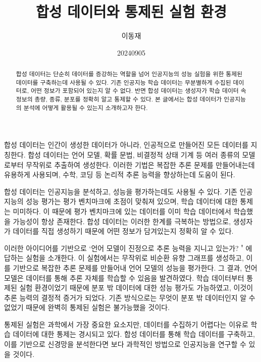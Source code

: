 \documentclass[11pt, oneside]{article}   	%
\title{합성 데이터와 통제된 실험 환경}
\author{이동재}
\date{20240905}
\begin{document}
\maketitle


\begin{abstract}
  합성 데이터는 단순히 데이터를 증강하는 역할을 넘어 인공지능의 성능 실험을 위한 통제된 데이터를 구축하는데 사용될 수 있다. 기존 인공지능 학습 데이터는 무분별하게 수집된 데이터로, 어떤 정보가 포함되어 있는지 알 수 없다. 반면 합성 데이터는 생성자가 학습 데이터 속 정보의 총량, 종류, 분포를 정확히 알고 통제할 수 있다. 본 글에서는 합성 데이터가 인공지능의 분석에 어떻게 활용될 수 있는지 소개하고자 한다.
\end{abstract}
합성 데이터는 인간이 생성한 데이터가 아니라, 인공적으로 만들어진 모든 데이터를 지칭한다. 합성 데이터는 언어 모델, 확률 문법, 비결정적 상태 기계 등 여러 종류의 모델로부터 무작위로 추출하여 생성한다. 이러한 기법은 복잡한 추론 문제를 만들어내는데 유용하게 사용되며, 수학, 코딩 등 논리적 추론 능력을 향상하는데 도움이 된다.

합성 데이터는 인공지능을 분석하고, 성능을 평가하는데도 사용될 수 있다. 기존 인공지능의 성능 평가는 평가 벤치마크에 초점이 맞춰져 있으며, 학습 데이터에 대한 통제는 미미하다. 이 때문에 평가 벤치마크에 있는 데이터를 이미 학습 데이터에서 학습했을 가능성이 항상 존재한다. 합성 데이터는 이러한 한계를 극복하는 방법으로, 생성자가 데이터를 직접 생성하기 때문에 어떤 정보가 담겨있는지 정확히 알 수 있다.

이러한 아이디어를 기반으로 `언어 모델이 진정으로 추론 능력을 지니고 있는가?＇에 답하는 실험을 소개한다. 이 실험에서는 무작위로 비순환 유향 그래프를 생성하고, 이를 기반으로 복잡한 추론 문제를 만들어내 언어 모델의 성능을 평가한다. 그 결과, 언어 모델은 데이터를 통해 추론 자체를 학습할 수 있음을 발견하였다. 학습 데이터부터 통제된 실험 환경이었기 때문에 분포 밖 데이터에 대한 성능 평가도 가능하였고, 이것이 추론 능력의 결정적 증거가 되었다. 기존 방식으로는 무엇이 분포 밖 데이터인지 알 수 없었기 때문에 완벽히 통제된 실험은 불가능했을 것이다.

통제된 실험은 과학에서 가장 중요한 요소지만, 데이터를 수집하기 어렵다는 이유로 학습 데이터에 대한 통제는 경시되고 있다. 합성 데이터를 통해 학습 데이터를 구축하고, 이를 기반으로 신경망을 분석한다면 보다 과학적인 방법으로 인공지능을 연구할 수 있을 것이다.
\end{document}
